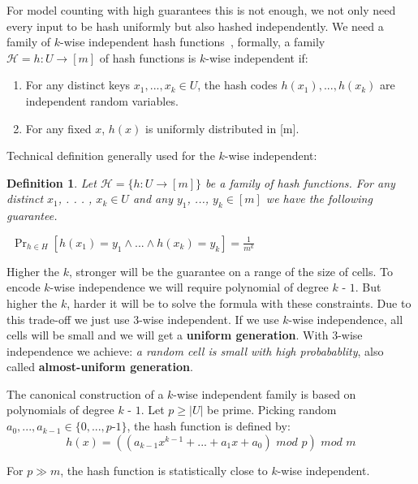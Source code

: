 \documentclass{article}
\newtheorem{definition}{Definition}
\begin{document}
For model counting with high guarantees this is not enough, we not only need every input to be hash uniformly but also hashed independently. We need a family of $k$-wise independent hash functions~\cite{DBLP:conf/focs/WegmanC79},
%
formally,
a family $\mathcal{H} = {h : U \to [m]}$ of hash functions
is $k$-wise independent if:
\begin{enumerate}
	\item For any distinct keys $x_1, ..., x_k \in U$, the hash codes
	$h(x_1), ..., h(x_k)$ are independent random variables.
	\item For any fixed $x$, $h(x)$ is uniformly distributed in [m].
\end{enumerate}

Technical definition generally used for the $k$-wise independent:
\begin{definition}
	Let $\mathcal{H}=\{h: U \to [m]\}$ be a family of hash functions. For any distinct $x_1$, . . . , $x_k \in U$ and any $y_1$, ..., $y_k \in [m]$ we have the following guarantee.

	$~~\Pr_{h\in H}
	[h(x_1) = y_1 \land ... \land h(x_k) = y_k] = \frac {1}
	{m^
		k}$
\end{definition}

Higher the $k$, stronger will be the guarantee on a range of the size of cells. To encode $k$-wise independence we will require polynomial of degree $k$ - $1$. But higher the $k$, harder it will be to solve the formula with these constraints. Due to this trade-off we just use 3-wise independent. If we use $k$-wise independence, all cells will be  small and we will get a \textbf{uniform generation}. With $3$-wise independence we achieve: \emph{a random cell is small with high probabablity}, also called \textbf{almost-uniform generation}.


The canonical construction of a $k$-wise independent family is based on polynomials
of degree $k$ - $1$. Let $p \geq |U|$ be prime. Picking random $a_0,...,a_{k - 1} \in \{0, . . . , p$-$ 1\}$,
the hash function is defined by:
\[ h(x) = ( ( a_{k-1} x^ {k - 1} + ... + a_1 x + a_0) \,\, mod \,\, p) \,\, mod \,\,  m\]


For $p \gg	 m$, the hash function is statistically close to $k$-wise independent.
\end{document}
